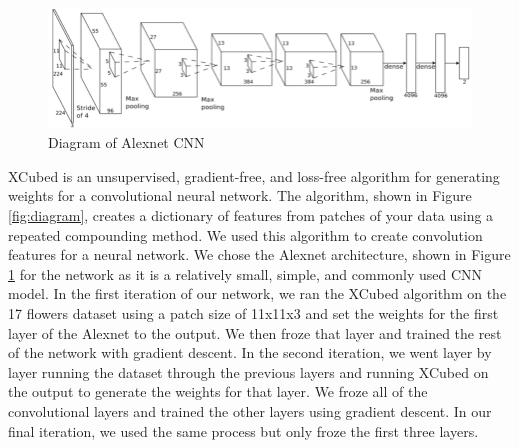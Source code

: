 \documentclass{article}
\begin{document}
\begin{figure}
    \centering
    \includegraphics[width=.8\linewidth]{Alexnet_diagram}
    \caption{Diagram of Alexnet CNN}
    \label{fig:alex}
\end{figure}
XCubed is an unsupervised, gradient-free, and loss-free algorithm for generating weights for a convolutional neural network. The algorithm, shown in Figure \ref{fig:diagram}, creates a dictionary of features from patches of your data using a repeated compounding method. We used this algorithm to create convolution features for a neural network. We chose the Alexnet\cite{alexnet} architecture, shown in Figure \ref{fig:alex} for the network as it is a relatively small, simple, and commonly used CNN model\cite{something}. In the first iteration of our network, we ran the XCubed algorithm on the 17 flowers dataset using a patch size of 11x11x3 and set the weights for the first layer of the Alexnet to the output. We then froze that layer and trained the rest of the network with gradient descent. In the second iteration, we went layer by layer running the dataset through the previous layers and running XCubed on the output to generate the weights for that layer. We froze all of the convolutional layers and trained the other layers using gradient descent. In our final iteration, we used the same process but only froze the first three layers.
\end{document}
